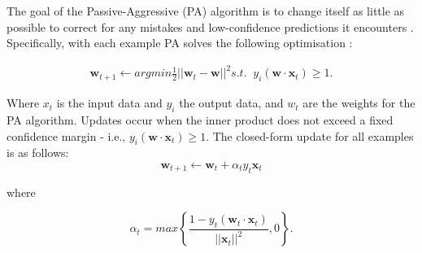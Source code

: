 \documentclass[final,3p,times,twocolumn,numbers]{elsarticle}
\begin{document}
%
%
%
%

 The goal of the Passive-Aggressive (PA) algorithm is to change itself as little as possible to correct for any mistakes and low-confidence predictions it encounters \cite{Gzik2014}. Specifically, with each example PA solves the following optimisation \cite{Ma2009}:

\begin{align}
    \boldsymbol{w}_{t+1}\leftarrow argmin \frac{1}{2}\left|\left|{\boldsymbol{w}_t-\boldsymbol{w}}\right|\right|^2 
    s.t. \; \; y_i(\boldsymbol{w}\cdot \boldsymbol{x}_t)\geq1.
\end{align}

\noindent Where $x_t$ is the input data and $y_i$ the output data, and $w_t$ are the weights for the PA algorithm. Updates occur when the inner product does not exceed a fixed confidence margin - i.e., $y_i(\boldsymbol{w}\cdot \boldsymbol{x}_t)\geq1$. The closed-form update for all examples is as follows:
\begin{equation}
    \boldsymbol{w}_{t+1}\leftarrow \boldsymbol{w}_{t} + \alpha_t y_t \boldsymbol{x}_t
\end{equation}

\noindent where 

\begin{equation}
\alpha_t=max\left\{\frac{1-y_t(\boldsymbol{w}_t\cdot\boldsymbol{x}_t)}{\left|\left|\boldsymbol{x}_t\right|\right|^2},0\right\}. 	
\end{equation}
\end{document}
